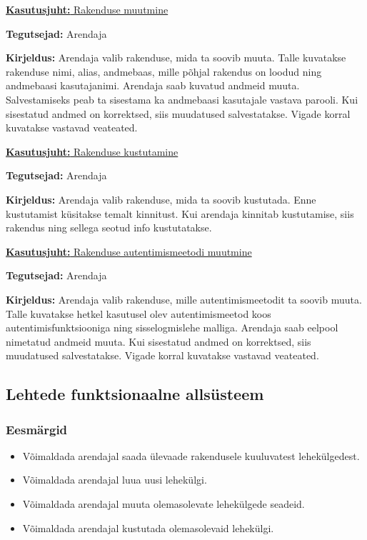 \documentclass[a4paper,12pt]{article} %
\begin{document}
\underline{\textbf{Kasutusjuht:} Rakenduse muutmine}
\par
\textbf{Tegutsejad:} Arendaja
\par
\textbf{Kirjeldus:} Arendaja valib rakenduse, mida ta soovib muuta. Talle kuvatakse rakenduse nimi, alias, andmebaas, mille põhjal rakendus on loodud ning andmebaasi kasutajanimi. Arendaja saab kuvatud andmeid muuta. Salvestamiseks peab ta sisestama ka andmebaasi kasutajale vastava parooli. Kui sisestatud andmed on korrektsed, siis muudatused salvestatakse. Vigade korral kuvatakse vastavad veateated.
\par

\underline{\textbf{Kasutusjuht:} Rakenduse kustutamine}
\par
\textbf{Tegutsejad:} Arendaja
\par
\textbf{Kirjeldus:} Arendaja valib rakenduse, mida ta soovib kustutada. Enne kustutamist küsitakse temalt kinnitust. Kui arendaja kinnitab kustutamise, siis rakendus ning sellega seotud info kustutatakse.
\par

\underline{\textbf{Kasutusjuht:} Rakenduse autentimismeetodi muutmine}
\par
\textbf{Tegutsejad:} Arendaja
\par
\textbf{Kirjeldus:} Arendaja valib rakenduse, mille autentimismeetodit ta soovib muuta. Talle kuvatakse hetkel kasutusel olev autentimismeetod koos autentimisfunktsiooniga ning sisselogmislehe malliga. Arendaja saab eelpool nimetatud andmeid muuta. Kui sisestatud andmed on korrektsed, siis muudatused salvestatakse. Vigade korral kuvatakse vastavad veateated.
\par

\subsection{Lehtede funktsionaalne allsüsteem}
\subsubsection{Eesmärgid}
\begin{itemize}
\item Võimaldada arendajal saada ülevaade rakendusele kuuluvatest lehekülgedest.
\item Võimaldada arendajal luua uusi lehekülgi.
\item Võimaldada arendajal muuta olemasolevate lehekülgede seadeid.
\item Võimaldada arendajal kustutada olemasolevaid lehekülgi.
\end{itemize}
\end{document}
